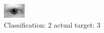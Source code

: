 \begin{figure}[h!]
\begin{center}
\includegraphics[width=0.60\columnwidth]{figures/ID538_class_2_target_3.png}
\end{center}
\caption{ Classification: 2 actual target: 3}
\label{fig:ID538_class_2_target_3}
\end{figure}
